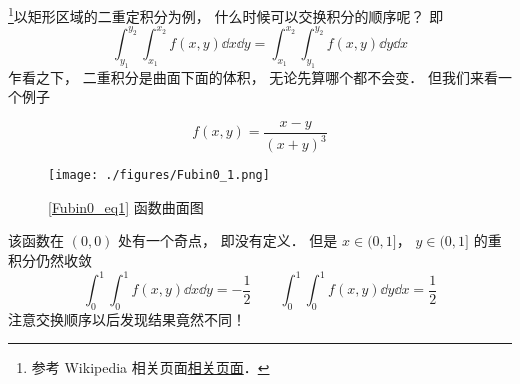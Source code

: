 
\footnote{参考 Wikipedia 相关页面\href{https://en.wikipedia.org/wiki/Fubini's_theorem}{相关页面}．}以矩形区域的二重定积分为例， 什么时候可以交换积分的顺序呢？ 即
\begin{equation}
\int_{y_1}^{y_2}\int_{x_1}^{x_2} f(x, y) \dd{x} \dd{y} = \int_{x_1}^{x_2}\int_{y_1}^{y_2} f(x, y) \dd{y}\dd{x}
\end{equation}
乍看之下， 二重积分是曲面下面的体积， 无论先算哪个都不会变． 但我们来看一个例子

\begin{example}{}
\begin{equation}\label{Fubin0_eq1}
f(x, y) = \frac{x - y}{(x+y)^3}
\end{equation}
\begin{figure}[ht]
\centering
\texttt{[image: ./figures/Fubin0\_1.png]}
\caption{\autoref{Fubin0_eq1} 函数曲面图} \label{Fubin0_fig1}
\end{figure}
该函数在 $(0,0)$ 处有一个奇点， 即没有定义． 但是 $x \in (0, 1]$， $y \in (0, 1]$ 的重积分仍然收敛
\begin{equation}
\int_0^1 \int_0^1 f(x,y) \dd{x} \dd{y} = -\frac{1}{2}
\qquad
\int_0^1 \int_0^1 f(x,y) \dd{y} \dd{x} = \frac{1}{2}
\end{equation}
注意交换顺序以后发现结果竟然不同！
\end{example}
